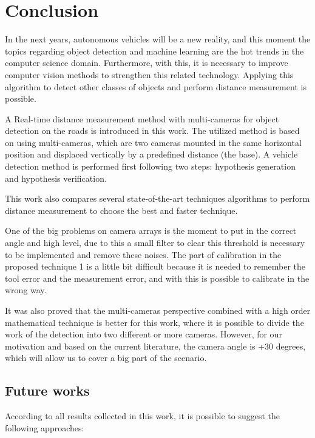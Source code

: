 \chapter{Conclusion}
\label{capitulo6}


In the next years, autonomous vehicles will be a new reality, and this moment the topics regarding object detection and machine learning are the hot trends in the computer science domain. Furthermore, with this, it is necessary to improve computer vision methods to strengthen this related technology. Applying this algorithm to detect other classes of objects and perform distance measurement is possible. 

A Real-time distance measurement method with multi-cameras for object detection on the roads is introduced in this work. The utilized method is based on using multi-cameras, which are two cameras mounted in the same horizontal position and displaced vertically by a predefined distance (the base). A vehicle detection method is performed first following two steps: hypothesis generation and hypothesis verification. 


This work also compares several state-of-the-art techniques algorithms to perform distance measurement to choose the best and faster technique. 

One of the big problems on camera arrays is the moment to put in the correct angle and high level, due to this a small filter to clear this threshold is necessary to be implemented and remove these noises. The part of calibration in the proposed technique 1 is a little bit difficult because it is needed to remember the tool error and the measurement error, and with this is possible to calibrate in the wrong way. 

It was also proved that the multi-cameras perspective combined with a high order mathematical technique is better for this work, where it is possible to divide the work of the detection into two different or more cameras. However, for our motivation and based on the current literature, the camera angle is +30 degrees, which will allow us to cover a big part of the scenario.   

\section{Future works}

According to all results collected in this work, it is possible to suggest the following approaches:

